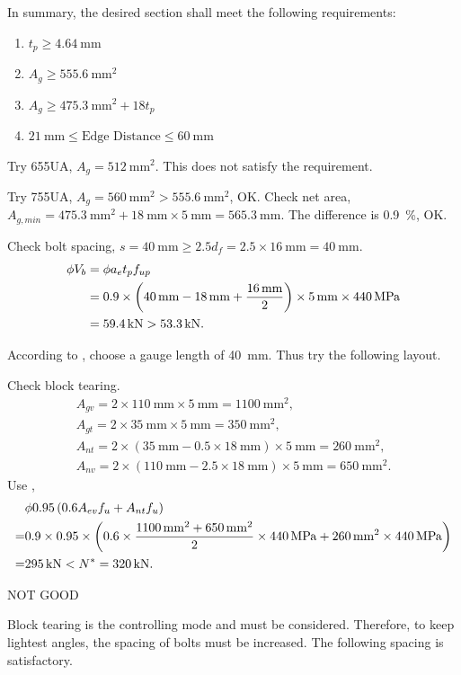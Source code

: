 \begin{solution}
In summary, the desired section shall meet the following requirements:
\begin{enumerate}
\item $t_p\geqslant\SI{4.64}{\mm}$
\item $A_g\geqslant\SI{555.6}{\mm^2}$
\item $A_g\geqslant\SI{475.3}{\mm^2}+18t_p$
\item $\SI{21}{\mm}\leqslant\text{Edge Distance}\leqslant\SI{60}{\mm}$
\end{enumerate}

Try 65\texttimes5UA, $A_g=\SI{512}{\mm^2}$.
This does not satisfy the requirement.

Try 75\texttimes5UA, $A_g=\SI{560}{\mm^2}>\SI{555.6}{\mm^2}$, OK.
Check net area,
$A_{g,min}=\SI{475.3}{\mm^2}+\SI{18}{\mm}\times\SI{5}{\mm}=\SI{565.3}{\mm}$.
The difference is \SI{0.9}{\percent}, OK.

Check bolt spacing, $s=\SI{40}{\mm}\geqslant2.5d_f=2.5\times\SI{16}{\mm}=\SI{40}{\mm}$.
\begin{align*}
\phi{}V_b&=\phi{}a_et_pf_{up}\\&=0.9\times\left(\SI{40}{\milli\meter}-\SI{18}{\milli\meter}+\dfrac{\SI{16}{\milli\meter}}{2}\right)\times\SI{5}{\milli\meter}\times\SI{440}{\mega\pascal}\\&=\SI{59.4}{\kilo\newton}>\SI{53.3}{\kilo\newton}.
\end{align*}

According to , choose a gauge length of \SI{40}{\mm}.
Thus try the following layout.
\begin{figure}[H]

\end{figure}
Check block tearing.
\begin{gather*}
A_{gv}=2\times\SI{110}{\mm}\times\SI{5}{\mm}=\SI{1100}{\mm^2},\\
A_{gt}=2\times\SI{35}{\mm}\times\SI{5}{\mm}=\SI{350}{\mm^2},\\
A_{nt}=2\times\left(\SI{35}{\mm}-0.5\times\SI{18}{\mm}\right)\times\SI{5}{\mm}=\SI{260}{\mm^2},\\
A_{nv}=2\times\left(\SI{110}{\mm}-2.5\times\SI{18}{\mm}\right)\times\SI{5}{\mm}=\SI{650}{\mm^2}.
\end{gather*}
Use ,
\begin{align*}
&\phi0.95\left(0.6A_{ev}f_u+A_{nt}f_u\right)\\
=&0.9\times0.95\times\left(0.6\times\dfrac{\SI{1100}{\milli\meter^2}+\SI{650}{\milli\meter^2}}{2}\times\SI{440}{\mega\pascal}+\SI{260}{\milli\meter^2}\times\SI{440}{\mega\pascal}\right)\\
=&\SI{295}{\kilo\newton}<N^*=\SI{320}{\kilo\newton}.
\end{align*}
\begin{flushright}
NOT GOOD
\end{flushright}
Block tearing is the controlling mode and must be considered.
Therefore, to keep lightest angles, the spacing of bolts must be increased.
The following spacing is satisfactory.
\begin{figure}[H]

\end{figure}
\end{solution}
